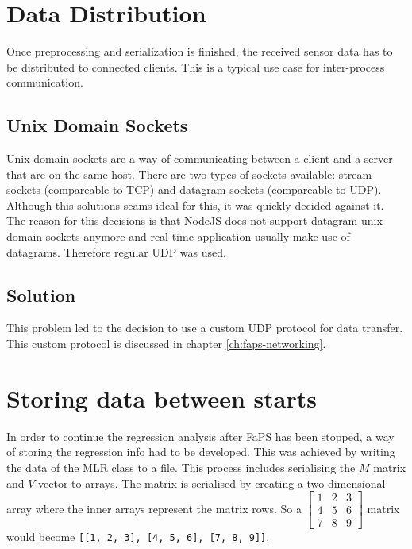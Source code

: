\section{Data Distribution}

Once preprocessing and serialization is finished, the received sensor data has to be distributed to connected clients. This is a typical use case for inter-process communication.

\subsection{Unix Domain Sockets}

Unix domain sockets are a way of communicating between a client and a server that are on the same host. There are two types of sockets available: stream sockets (compareable to TCP) and datagram sockets (compareable to
UDP). Although this solutions seams ideal for this, it was quickly decided against it. The reason for this decisions is that NodeJS does not support datagram unix domain sockets anymore and real time application usually
make use of datagrams. Therefore regular UDP was used.

\subsection{Solution}

This problem led to the decision to use a custom UDP protocol for data transfer. This custom protocol is discussed in chapter \ref{ch:faps-networking}.

\section{Storing data between starts}

In order to continue the regression analysis after FaPS has been stopped, a way of storing the regression info had to be developed. This was achieved by writing the data of the MLR class to a file. This process includes serialising the $ M $ matrix and $ V $ vector to arrays. The matrix is serialised by creating a two dimensional array where the inner arrays represent the matrix rows. So a $ \begin{bmatrix} 1 & 2 & 3 \\ 4 & 5 & 6 \\ 7 & 8 & 9 \end{bmatrix} $ matrix would become \lstinline{[[1, 2, 3], [4, 5, 6], [7, 8, 9]]}.
